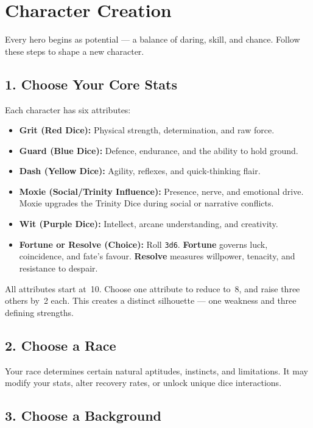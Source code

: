 \section{Character Creation}

\noindent
Every hero begins as potential — a balance of daring, skill, and chance.
Follow these steps to shape a new character.

\subsection*{1. Choose Your Core Stats}

Each character has six attributes:

\begin{itemize}
  \item \textbf{Grit (Red Dice):} Physical strength, determination, and raw force.
  \item \textbf{Guard (Blue Dice):} Defence, endurance, and the ability to hold ground.
  \item \textbf{Dash (Yellow Dice):} Agility, reflexes, and quick-thinking flair.
  \item \textbf{Moxie (Social/Trinity Influence):} Presence, nerve, and emotional drive.  Moxie upgrades the Trinity Dice during social or narrative conflicts.
  \item \textbf{Wit (Purple Dice):} Intellect, arcane understanding, and creativity.
  \item \textbf{Fortune or Resolve (Choice):}  
        Roll \texttt{3d6}.  
        \textbf{Fortune} governs luck, coincidence, and fate’s favour.  
        \textbf{Resolve} measures willpower, tenacity, and resistance to despair.
\end{itemize}

All attributes start at~10.  
Choose one attribute to reduce to~8, and raise three others by~2 each.  
This creates a distinct silhouette — one weakness and three defining strengths.

\subsection*{2. Choose a Race}

Your race determines certain natural aptitudes, instincts, and limitations.
It may modify your stats, alter recovery rates, or unlock unique dice interactions.

\subsection*{3. Choose a Background}

